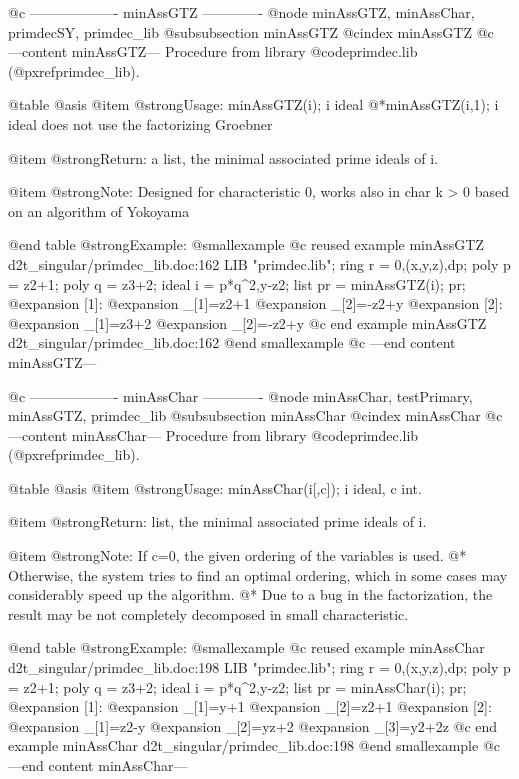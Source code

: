 @c ------------------- minAssGTZ -------------
@node minAssGTZ, minAssChar, primdecSY, primdec_lib
@subsubsection minAssGTZ
@cindex minAssGTZ
@c ---content minAssGTZ---
Procedure from library @code{primdec.lib} (@pxref{primdec_lib}).

@table @asis
@item @strong{Usage:}
minAssGTZ(i); i ideal
@*minAssGTZ(i,1); i ideal does not use the factorizing Groebner

@item @strong{Return:}
a list, the minimal associated prime ideals of i.

@item @strong{Note:}
Designed for characteristic 0, works also in char k > 0 based
on an algorithm of Yokoyama

@end table
@strong{Example:}
@smallexample
@c reused example minAssGTZ d2t_singular/primdec_lib.doc:162 
LIB "primdec.lib";
ring  r = 0,(x,y,z),dp;
poly  p = z2+1;
poly  q = z3+2;
ideal i = p*q^2,y-z2;
list pr = minAssGTZ(i);
pr;
@expansion{} [1]:
@expansion{}    _[1]=z2+1
@expansion{}    _[2]=-z2+y
@expansion{} [2]:
@expansion{}    _[1]=z3+2
@expansion{}    _[2]=-z2+y
@c end example minAssGTZ d2t_singular/primdec_lib.doc:162
@end smallexample
@c ---end content minAssGTZ---

@c ------------------- minAssChar -------------
@node minAssChar, testPrimary, minAssGTZ, primdec_lib
@subsubsection minAssChar
@cindex minAssChar
@c ---content minAssChar---
Procedure from library @code{primdec.lib} (@pxref{primdec_lib}).

@table @asis
@item @strong{Usage:}
minAssChar(i[,c]); i ideal, c int.

@item @strong{Return:}
list, the minimal associated prime ideals of i.

@item @strong{Note:}
If c=0, the given ordering of the variables is used. @*
Otherwise, the system tries to find an optimal ordering,
which in some cases may considerably speed up the algorithm. @*
Due to a bug in the factorization, the result may be not completely
decomposed in small characteristic.

@end table
@strong{Example:}
@smallexample
@c reused example minAssChar d2t_singular/primdec_lib.doc:198 
LIB "primdec.lib";
ring  r = 0,(x,y,z),dp;
poly  p = z2+1;
poly  q = z3+2;
ideal i = p*q^2,y-z2;
list pr = minAssChar(i);
pr;
@expansion{} [1]:
@expansion{}    _[1]=y+1
@expansion{}    _[2]=z2+1
@expansion{} [2]:
@expansion{}    _[1]=z2-y
@expansion{}    _[2]=yz+2
@expansion{}    _[3]=y2+2z
@c end example minAssChar d2t_singular/primdec_lib.doc:198
@end smallexample
@c ---end content minAssChar---

